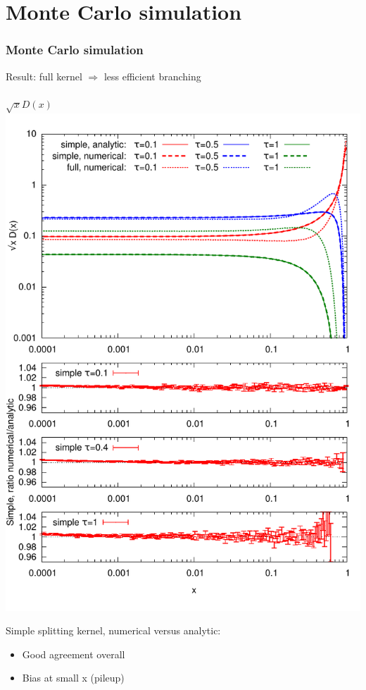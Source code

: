 \documentclass[pstricks,mathserif]{beamer}
\begin{document}
\section{Monte Carlo simulation}

\begin{frame}
\frametitle{Monte Carlo simulation}

Result: full kernel $\Rightarrow$ less efficient branching\\
~\\



\centering
\small $\sqrt{x} D(x)$
\includegraphics[width=1\linewidth]{times.pdf}
\endminipage\hfill
{}
\small 

Simple splitting kernel, numerical versus analytic:
\begin{itemize}
\item Good agreement overall
\item Bias at small x (pileup)
\end{itemize}


\end{frame}
\end{document}

